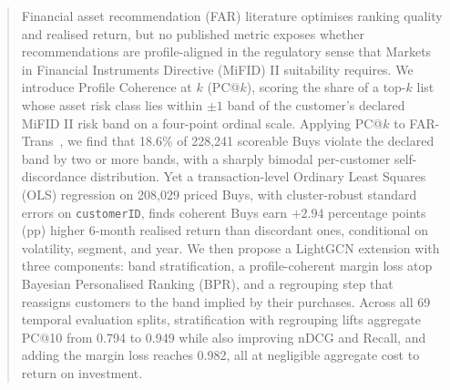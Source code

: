 \begin{abstract}
Financial asset recommendation (FAR) literature optimises ranking quality and realised return, but no published metric exposes whether recommendations are profile-aligned in the regulatory sense that  Markets in Financial Instruments Directive (MiFID) II suitability requires. We introduce Profile Coherence at $k$ (PC@$k$), scoring the share of a top-$k$ list whose asset risk class lies within $\pm 1$ band of the customer's declared MiFID II risk band on a four-point ordinal scale. Applying PC@$k$ to FAR-Trans~\cite{sanzcruzado2024fartransinvestmentdatasetfinancial}, we find that 18.6\% of 228{,}241 scoreable Buys violate the declared band by two or more bands, with a sharply bimodal per-customer self-discordance distribution. Yet a transaction-level Ordinary Least Squares (OLS) regression on 208{,}029 priced Buys, with cluster-robust standard errors on \texttt{customerID}, finds coherent Buys earn $+2.94$ percentage points (pp) higher 6-month realised return than discordant ones, conditional on volatility, segment, and year. We then propose a LightGCN extension with three components: band stratification, a profile-coherent margin loss atop Bayesian Personalised Ranking (BPR), and a regrouping step that reassigns customers to the band implied by their purchases. Across all 69 temporal evaluation splits, stratification with regrouping lifts aggregate PC@10 from 0.794 to 0.949 while also improving nDCG and Recall, and adding the margin loss reaches 0.982, all at negligible aggregate cost to return on investment.
\end{abstract}
